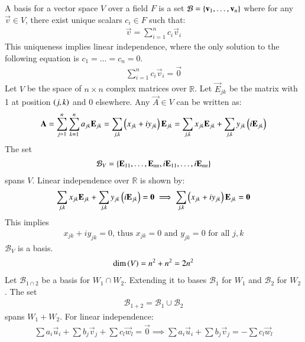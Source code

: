 \documentclass[journal]{IEEEtran}
\begin{document}
A basis for a vector space $V$ over a field $F$ is a set $\mathcal{B} = \left\{\mathbf{v}_1, \dots, \mathbf{v}_n\right\}$ where for any $\vec{v} \in V$, there exist unique scalars $c_i \in F$ such that:
\begin{align}
    \vec{v} = \sum_{i=1}^n c_i \vec{v}_i
\end{align}
This uniqueness implies linear independence, where the only solution to the following equation is $c_1 = \dots = c_n = 0$.
\begin{align}
    \sum_{i=1}^n c_i \vec{v}_i = \vec{0}
\end{align}
Let $V$ be the space of $n \times n$ complex matrices over $\mathbb{R}$. Let $\vec{E}_{jk}$ be the matrix with 1 at position $\left(j,k\right)$ and 0 elsewhere. Any $\vec{A} \in V$ can be written as:
\begin{align}
    \mathbf{A} = \sum_{j=1}^n \sum_{k=1}^n a_{jk} \mathbf{E}_{jk} = \sum_{j,k} \left(x_{jk} + i y_{jk}\right) \mathbf{E}_{jk} = \sum_{j,k} x_{jk}\mathbf{E}_{jk} + \sum_{j,k} y_{jk}\left(i\mathbf{E}_{jk}\right)
\end{align}
The set 
\begin{align}
    \mathcal{B}_V = \left\{\mathbf{E}_{11}, \dots, \mathbf{E}_{nn}, i\mathbf{E}_{11}, \dots, i\mathbf{E}_{nn}\right\}
\end{align}
spans $V$. Linear independence over $\mathbb{R}$ is shown by:
\begin{align}
    \sum_{j,k} x_{jk}\mathbf{E}_{jk} + \sum_{j,k} y_{jk}\left(i\mathbf{E}_{jk}\right) = \mathbf{0} \implies \sum_{j,k} \left(x_{jk} + i y_{jk}\right) \mathbf{E}_{jk} = \mathbf{0}
\end{align}
This implies 
\begin{align}
    x_{jk} + i y_{jk} = 0\text{, thus }x_{jk}=0\text{ and }y_{jk}=0\text{ for all }j,k
\end{align}    
$\mathcal{B}_V$ is a basis.
\begin{align}
    \dim\left(V\right) = n^2 + n^2 = 2n^2
\end{align}
Let $\mathcal{B}_{1 \cap 2}$ be a basis for $W_1 \cap W_2$. Extending it to bases $\mathcal{B}_1$ for $W_1$ and $\mathcal{B}_2$ for $W_2$. The set 
\begin{align*}
    \mathcal{B}_{1+2} = \mathcal{B}_1 \cup \mathcal{B}_2
\end{align*}
spans $W_1+W_2$. For linear independence:
\begin{align}
    \sum a_i \vec{u}_i + \sum b_j \vec{v}_j + \sum c_l \vec{w}_l = \vec{0} \implies \sum a_i \vec{u}_i + \sum b_j \vec{v}_j = - \sum c_l \vec{w}_l
\end{align}
\end{document}
